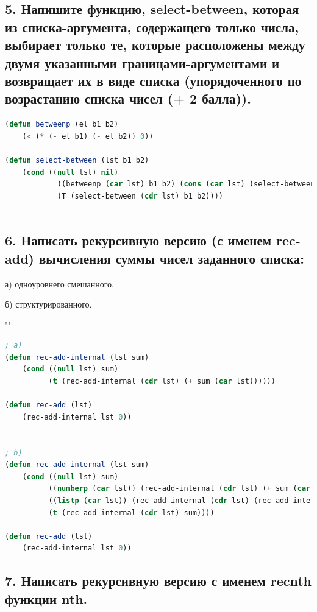 \documentclass[12pt]{report}
\begin{document}
\subsection*{5. Напишите функцию, select-between, которая из списка-аргумента, содержащего только
	числа, выбирает только те, которые расположены между двумя указанными границами-аргументами и возвращает их в виде списка (упорядоченного по возрастанию списка чисел
	(+ 2 балла)).}

\begin{lstlisting}[label=6xd, caption=Решение задания №5, language=lisp]
(defun betweenp (el b1 b2)
	(< (* (- el b1) (- el b2)) 0))

(defun select-between (lst b1 b2)
	(cond ((null lst) nil)
			((betweenp (car lst) b1 b2) (cons (car lst) (select-between (cdr lst) b1 b2)))
			(T (select-between (cdr lst) b1 b2))))
	
\end{lstlisting}

\newpage
\subsection*{6. Написать рекурсивную версию (с именем rec-add) вычисления суммы чисел заданного
	списка:}

а) одноуровнего смешанного,

б) структурированного.

""\newline
\begin{lstlisting}[label=6xd, caption=Решение задания №6, language=lisp]
; a)
(defun rec-add-internal (lst sum) 
	(cond ((null lst) sum) 
		  (t (rec-add-internal (cdr lst) (+ sum (car lst))))))
		  
(defun rec-add (lst) 
	(rec-add-internal lst 0))


; b)
(defun rec-add-internal (lst sum) 
	(cond ((null lst) sum) 
		  ((numberp (car lst)) (rec-add-internal (cdr lst) (+ sum (car lst))))
		  ((listp (car lst)) (rec-add-internal (cdr lst) (rec-add-internal (car lst) sum)))
		  (t (rec-add-internal (cdr lst) sum))))

(defun rec-add (lst) 
	(rec-add-internal lst 0))
\end{lstlisting}

\subsection*{7. Написать рекурсивную версию с именем recnth функции nth.}
\end{document}
